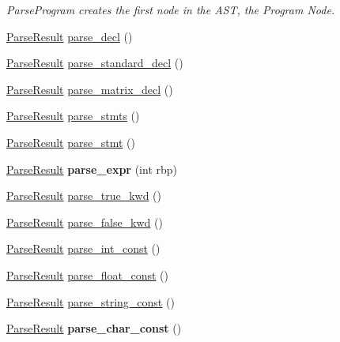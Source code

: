 \begin{DoxyCompactItemize}
\begin{DoxyCompactList}\small\item\em Parse\+Program creates the first node in the A\+ST, the Program Node. \end{DoxyCompactList}\item 
\hyperlink{classfcal_1_1parser_1_1ParseResult}{Parse\+Result} \hyperlink{classfcal_1_1parser_1_1Parser_a5f3775636ba12362f72e039561336557}{parse\+\_\+decl} ()
\item 
\hyperlink{classfcal_1_1parser_1_1ParseResult}{Parse\+Result} \hyperlink{classfcal_1_1parser_1_1Parser_aa62545007028e5272d9643c876a9822c}{parse\+\_\+standard\+\_\+decl} ()
\item 
\hyperlink{classfcal_1_1parser_1_1ParseResult}{Parse\+Result} \hyperlink{classfcal_1_1parser_1_1Parser_aa4fe3c8652e6b19863d561f7bd5d6184}{parse\+\_\+matrix\+\_\+decl} ()
\item 
\hyperlink{classfcal_1_1parser_1_1ParseResult}{Parse\+Result} \hyperlink{classfcal_1_1parser_1_1Parser_a4380df554ab7d5e34118f766270de432}{parse\+\_\+stmts} ()
\item 
\hyperlink{classfcal_1_1parser_1_1ParseResult}{Parse\+Result} \hyperlink{classfcal_1_1parser_1_1Parser_aa5a86ad0157bcd6f1c65a849ea5acafa}{parse\+\_\+stmt} ()
\item 
\hyperlink{classfcal_1_1parser_1_1ParseResult}{Parse\+Result} {\bfseries parse\+\_\+expr} (int rbp)\hypertarget{classfcal_1_1parser_1_1Parser_ae3ef50b5c351bd8d899be70b00977246}{}\label{classfcal_1_1parser_1_1Parser_ae3ef50b5c351bd8d899be70b00977246}

\item 
\hyperlink{classfcal_1_1parser_1_1ParseResult}{Parse\+Result} \hyperlink{classfcal_1_1parser_1_1Parser_a90f9e6e5bb7b0bb8f6165653081d9df3}{parse\+\_\+true\+\_\+kwd} ()
\item 
\hyperlink{classfcal_1_1parser_1_1ParseResult}{Parse\+Result} \hyperlink{classfcal_1_1parser_1_1Parser_a3118c7b669131067232a17de629549f6}{parse\+\_\+false\+\_\+kwd} ()
\item 
\hyperlink{classfcal_1_1parser_1_1ParseResult}{Parse\+Result} \hyperlink{classfcal_1_1parser_1_1Parser_a8acdff8197580eb1d945072ff679306d}{parse\+\_\+int\+\_\+const} ()
\item 
\hyperlink{classfcal_1_1parser_1_1ParseResult}{Parse\+Result} \hyperlink{classfcal_1_1parser_1_1Parser_a86beefd5cab1bacded97977bd0785f31}{parse\+\_\+float\+\_\+const} ()
\item 
\hyperlink{classfcal_1_1parser_1_1ParseResult}{Parse\+Result} \hyperlink{classfcal_1_1parser_1_1Parser_ac87c57a45735cf4a811b4517e62001d5}{parse\+\_\+string\+\_\+const} ()
\item 
\hyperlink{classfcal_1_1parser_1_1ParseResult}{Parse\+Result} {\bfseries parse\+\_\+char\+\_\+const} ()\hypertarget{classfcal_1_1parser_1_1Parser_ab8d667fc04e0cbea885b0def177a5b8c}{}\label{classfcal_1_1parser_1_1Parser_ab8d667fc04e0cbea885b0def177a5b8c}


\end{DoxyCompactItemize}
